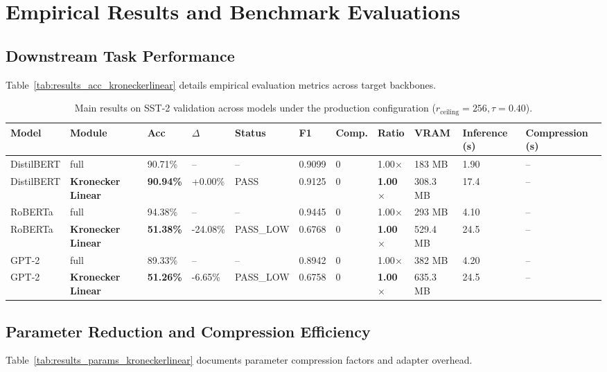 \section{Empirical Results and Benchmark Evaluations}

\subsection{Downstream Task Performance}
Table~\ref{tab:results_acc_kroneckerlinear} details empirical evaluation metrics across target backbones.

\begin{table}[t]
\centering
\small
\begin{tabular}{lllllllllll}
\toprule
\textbf{Model} & \textbf{Module} & \textbf{Acc} & \textbf{$\Delta$} & \textbf{Status} & \textbf{F1} & \textbf{Comp.} & \textbf{Ratio} & \textbf{VRAM} & \textbf{Inference (s)} & \textbf{Compression (s)} \\
\midrule
DistilBERT & full & 90.71\% & -- & -- & 0.9099 & 0 & 1.00$\times$ & 183 MB & 1.90 & -- \\
DistilBERT & \textbf{Kronecker Linear} & \textbf{90.94\%} & +0.00\% & PASS & 0.9125 & 0 & \textbf{1.00$\times$} & 308.3 MB & 17.4 & -- \\
RoBERTa & full & 94.38\% & -- & -- & 0.9445 & 0 & 1.00$\times$ & 293 MB & 4.10 & -- \\
RoBERTa & \textbf{Kronecker Linear} & \textbf{51.38\%} & -24.08\% & PASS_LOW & 0.6768 & 0 & \textbf{1.00$\times$} & 529.4 MB & 24.5 & -- \\
GPT-2 & full & 89.33\% & -- & -- & 0.8942 & 0 & 1.00$\times$ & 382 MB & 4.20 & -- \\
GPT-2 & \textbf{Kronecker Linear} & \textbf{51.26\%} & -6.65\% & PASS_LOW & 0.6758 & 0 & \textbf{1.00$\times$} & 635.3 MB & 24.5 & -- \\
\bottomrule
\end{tabular}
\caption{Main results on SST-2 validation across models under the production configuration ($r_{\mathrm{ceiling}}=256, \tau=0.40$).}
\label{tab:main_sst2}
\end{table}

\subsection{Parameter Reduction and Compression Efficiency}
Table~\ref{tab:results_params_kroneckerlinear} documents parameter compression factors and adapter overhead.

